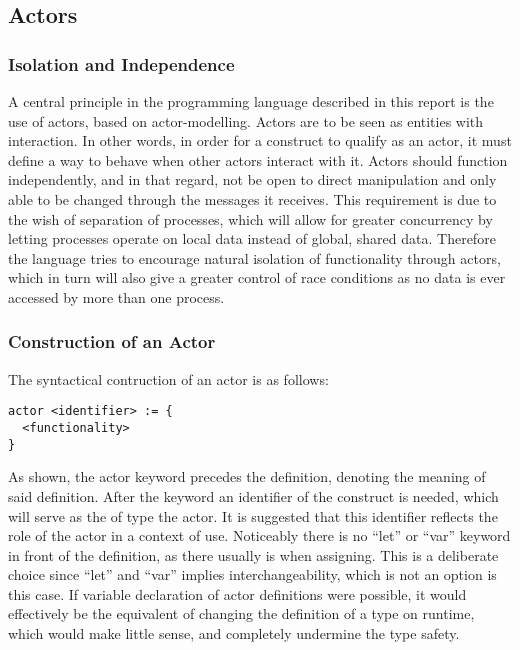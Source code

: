 \subsection{Actors}


\subsubsection{Isolation and Independence}

A central principle in the programming language described in this report is the use of actors, based on actor-modelling. Actors are to be seen as entities with interaction. In other words, in order for a construct to qualify as an actor, it must define a way to behave when other actors interact with it. Actors should function independently, and in that regard, not be open to direct manipulation and only able to be changed through the messages it receives. This requirement is due to the wish of separation of processes, which will allow for greater concurrency by letting processes operate on local data instead of global, shared data. Therefore the language tries to encourage natural isolation of functionality through actors, which in turn will also give a greater control of race conditions as no data is ever accessed by more than one process.

\subsubsection{Construction of an Actor}
\label{sub:constructionOfAnActor}

The syntactical contruction of an actor is as follows:

\begin{lstlisting}
actor <identifier> := {
  <functionality>
}
\end{lstlisting}

As shown, the actor keyword precedes the definition, denoting the meaning of said definition. After the keyword an identifier of the construct is needed, which will serve as the of type the actor. It is suggested that this identifier reflects the role of the actor in a context of use. Noticeably there is no \enquote{let} or \enquote{var} keyword in front of the definition, as there usually is when assigning. This is a deliberate choice since \enquote{let} and \enquote{var} implies interchangeability, which is not an option is this case. If variable declaration of actor definitions were possible, it would effectively be the equivalent of changing the definition of a type on runtime, which would make little sense, and completely undermine the type safety.


